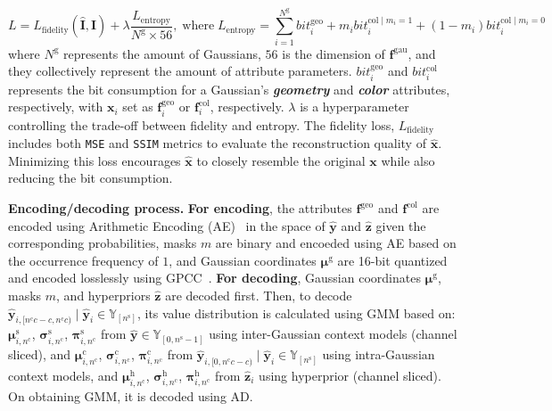 \documentclass{article} %
\begin{document}
\vspace{-18pt}
\begin{equation}
    L = L_{\text{fidelity}}(\hat{\bm{I}}, {\bm{I}}) + \lambda\frac{L_{\text{entropy}}}{N^\text{g}\times 56}, \; \text{where}\; L_{\text{entropy}} = \sum_{i=1}^{N^\text{g}} bit_i^{\text{geo}} + m_ibit_i^{\text{col} \mid m_i=1} + (1-m_i)bit_i^{\text{col} \mid m_i=0}
\end{equation}
where ${N^\text{g}}$ represents the amount of Gaussians, $56$ is the dimension of $\bm{f}^{\text{gau}}$, and they collectively represent the amount of attribute parameters. $bit_i^{\text{geo}}$ and $bit_i^{\text{col}}$ represents the bit consumption for a Gaussian's \textbf{\textit{geometry}} and \textbf{\textit{color}} attributes, respectively, with $\bm{x}_i$ set as $\bm{f}^{\text{geo}}_i$ or $\bm{f}^{\text{col}}_i$, respectively. $\lambda$ is a hyperparameter controlling the trade-off between fidelity and entropy. The fidelity loss, $L_{\text{fidelity}}$ includes both \texttt{MSE} and \texttt{SSIM} metrics to evaluate the reconstruction quality of $\hat{\bm{x}}$. Minimizing this loss encourages $\hat{\bm{x}}$ to closely resemble the original $\bm{x}$ while also reducing the bit consumption.

\textbf{Encoding/decoding process.} \textbf{For encoding}, the attributes $\bm{f}^{\text{geo}}$ and $\bm{f}^{\text{col}}$ are encoded using Arithmetic Encoding (AE)~\citep{AE} in the space of $\hat{\bm{y}}$ and $\hat{\bm{z}}$ given the corresponding probabilities, masks $m$ are binary and encoeded using AE based on the occurrence frequency of $1$, and Gaussian coordinates $\bm{\mu}^{\text{g}}$ are 16-bit quantized and encoded losslessly using GPCC~\citep{GPCC}. \textbf{For decoding}, Gaussian coordinates $\bm{\mu}^{\text{g}}$, masks $m$, and hyperpriors $\hat{\bm{z}}$ are decoded first. Then, to decode $\hat{\bm{y}}_{i, [n^\text{c}c-c, n^\text{c}c)} \mid \hat{\bm{y}}_i\in \mathbb{Y}_{[n^\text{s}]}$, its value distribution is calculated using GMM based on: $\bm{\mu}^\text{s}_{i, n^\text{c}}$, $\bm{\sigma}^\text{s}_{i, n^\text{c}}$, $\bm{\pi}^\text{s}_{i, n^\text{c}}$ from $\hat{\bm{y}}\in \mathbb{Y}_{[0,n^\text{s}-1]}$ using inter-Gaussian context models (channel sliced), and $\bm{\mu}^\text{c}_{i, n^\text{c}}$, $\bm{\sigma}^\text{c}_{i, n^\text{c}}$, $\bm{\pi}^\text{c}_{i, n^\text{c}}$ from $\hat{\bm{y}}_{i, [0,n^\text{c}c-c)} \mid \hat{\bm{y}}_i\in \mathbb{Y}_{[n^\text{s}]}$ using intra-Gaussian context models, and $\bm{\mu}^\text{h}_{i, n^\text{c}}$, $\bm{\sigma}^\text{h}_{i, n^\text{c}}$, $\bm{\pi}^\text{h}_{i, n^\text{c}}$ from $\hat{\bm{z}}_i$ using hyperprior (channel sliced). On obtaining GMM, it is decoded using AD.
 
\end{document}
